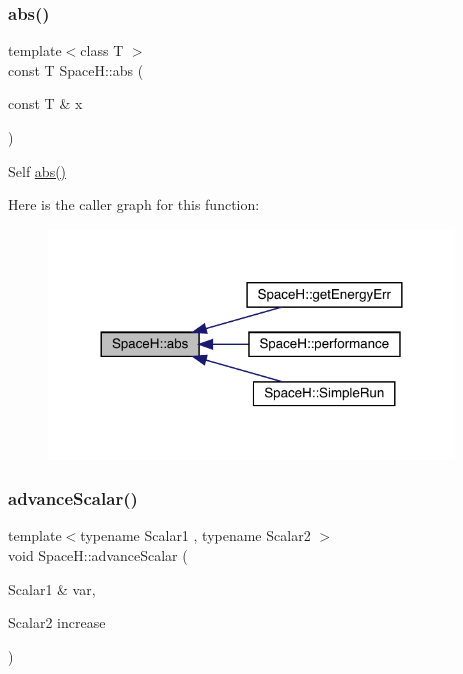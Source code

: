 \subsubsection{\texorpdfstring{abs()}{abs()}}
{\footnotesize\ttfamily template$<$class T $>$ \\
const T Space\+H\+::abs (\begin{DoxyParamCaption}\item[{const T \&}]{x }\end{DoxyParamCaption})\hspace{0.3cm}{\ttfamily [inline]}}



Self \mbox{\hyperlink{namespace_space_h_a90bc8cc5a4fc9c2a7353f9bfe7d5684d}{abs()}} 

Here is the caller graph for this function\+:
\nopagebreak
\begin{figure}[H]
\begin{center}
\leavevmode
\includegraphics[width=305pt]{namespace_space_h_a90bc8cc5a4fc9c2a7353f9bfe7d5684d_icgraph}
\end{center}
\end{figure}
\mbox{\label{namespace_space_h_a15f1fd0977da382828652627f5dbcdb9}} 
\subsubsection{\texorpdfstring{advance\+Scalar()}{advanceScalar()}}
{\footnotesize\ttfamily template$<$typename Scalar1 , typename Scalar2 $>$ \\
void Space\+H\+::advance\+Scalar (\begin{DoxyParamCaption}\item[{Scalar1 \&}]{var,  }\item[{Scalar2}]{increase }\end{DoxyParamCaption})\hspace{0.3cm}{\ttfamily [inline]}}



